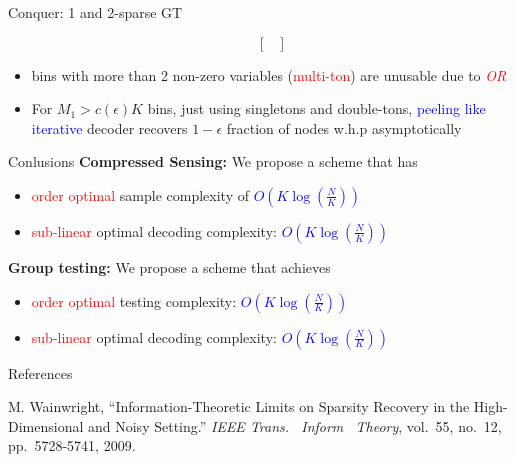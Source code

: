 \documentclass[final]{beamer}
\newlength{\threecolwid}
\newlength{\blockskip}
\newlength{\paraskip}
\begin{document}
\begin{frame}
\begin{columns}[t]
\begin{column}{\threecolwid}
\begin{block}{\Large Conquer: 1 and 2-sparse GT}
\begin{itemize}
\begin{equation*}
\begin{bmatrix}
				    \end{bmatrix}
		        \end{equation*}
		      \item bins with more than 2 non-zero variables (\textcolor{red}{multi-ton}) are unusable due to \textcolor{red}{\textit{OR}}
		      \item For $M_1>c(\epsilon)K$ bins, just using singletons and double-tons, \textcolor{blue}{peeling like iterative} decoder recovers $1-\epsilon$ fraction of nodes w.h.p asymptotically
    	\end{itemize}
    \end{block}      
\vspace{\blockskip}    

%    
      

         \begin{alertblock}{\Large Conlusions} 
	    \textbf{Compressed Sensing:} We propose a scheme that has
			\begin{itemize}
			\itemsep10pt
				\item \textcolor{red}{order optimal} sample complexity of \textcolor{blue}{$O(K\log (\frac{N}{K}))$}
				\item \textcolor{red}{sub-linear} optimal decoding complexity: \textcolor{blue}{$O(K\log (\frac{N}{K}))$}
			\end{itemize} 
\vspace{\paraskip}    
  
   \textbf{Group testing:} We propose a scheme that achieves
		\begin{itemize}
		\itemsep10pt
			\item \textcolor{red}{order optimal} testing complexity: \textcolor{blue}{$O(K\log (\frac{N}{K}))$}
			\item \textcolor{red}{sub-linear} optimal decoding complexity: \textcolor{blue}{$O(K\log (\frac{N}{K}))$}
		\end{itemize} 
    \end{alertblock}
\vspace{\blockskip}    

    \vspace{2.5cm}
    \begin{block}{References}
      \begin{thebibliography}{10}
M. Wainwright, ``Information-Theoretic Limits on Sparsity Recovery in the High-Dimensional and Noisy Setting.'' \emph{IEEE Trans. \ Inform \ Theory}, vol.~55, no.~12, pp.~5728-5741, 2009.


\end{thebibliography}
\end{block}
\end{column}
\end{columns}
\end{frame}
\end{document}

